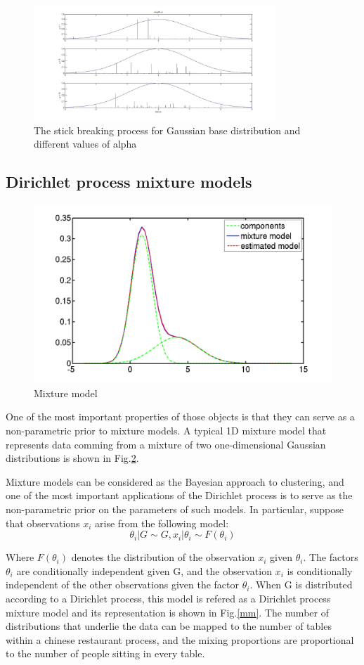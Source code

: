 \documentclass[twoside,hidelinks]{article}
\begin{document}
\begin{figure}[h!]
          \centerline{\includegraphics[width=0.81\textwidth]{stickBreakGaus}}
	\caption{The stick breaking process for Gaussian base distribution and different values of alpha}
	\label{crpGausBase}
\end{figure}

\subsection{Dirichlet process mixture models}

\begin{figure}[!ht]
    \centerline{\includegraphics[width=.45\textwidth]{1DGMM}}
	\caption{Mixture model}
	\label{1dGMM}
\end{figure}

One of the most important properties of those objects is that they can serve as a non-parametric prior to mixture models. A typical 1D mixture model that represents data comming from a mixture of two one-dimensional Gaussian distributions is shown in Fig.\ref{1dGMM}.

Mixture models can be considered as the Bayesian approach to clustering, and one of the most important applications of the Dirichlet process is to serve as the non-parametric prior on the parameters of such models. In particular, suppose that observations $x_i$ arise from the following model:
	\begin{equation}
			\theta_i | G \sim G ,
			x_i | \theta_i \sim F(\theta_i )
	\end{equation}

Where $F(\theta_i )$ denotes the distribution of the observation $x_i$ given $\theta_i $. The factors $ \theta_i $ are conditionally independent given G, and the observation $x_i$ is conditionally independent of the other observations given the factor $\theta_i$. When G is distributed according to a Dirichlet process, this model is refered as a Dirichlet process mixture model and its representation is shown in Fig.\ref{mm}. The number of distributions that underlie the data can be mapped to the number of tables within a chinese restaurant process, and the mixing proportions are proportional to the number of people sitting in every table.
\end{document}
